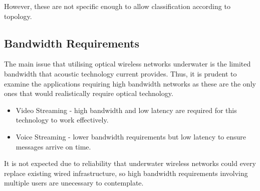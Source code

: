 However, these are not specific enough to allow classification according
to topology.

\subsection{Bandwidth Requirements}
The main issue that utilising optical wireless networks underwater is the
limited bandwidth that acoustic technology current provides. Thus, it is
prudent to examine the applications requiring high bandwidth networks as these
are the only ones that would realistically require optical technology.

\begin{itemize}
\item{Video Streaming - high bandwidth and low latency are required for this
technology to work effectively.}
\item{Voice Streaming - lower bandwidth requirements but low latency to ensure
messages arrive on time.}
\end{itemize}

It is not expected due to reliability that underwater wireless networks
could every replace existing wired infrastructure, so high bandwidth
requirements involving multiple users are unecessary to contemplate.